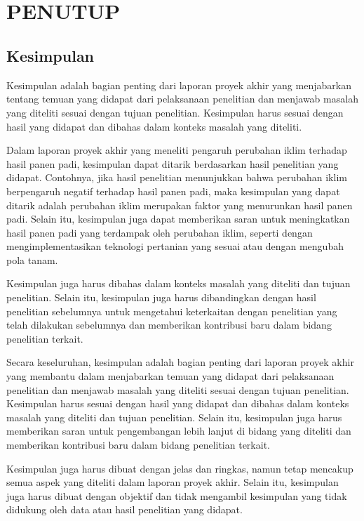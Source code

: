 \chapter[PENUTUP]{\\ PENUTUP}

\section{Kesimpulan}
Kesimpulan adalah bagian penting dari laporan proyek akhir yang menjabarkan tentang temuan yang didapat dari pelaksanaan penelitian dan menjawab masalah yang diteliti sesuai dengan tujuan penelitian. Kesimpulan harus sesuai dengan hasil yang didapat dan dibahas dalam konteks masalah yang diteliti.

Dalam laporan proyek akhir yang meneliti pengaruh perubahan iklim terhadap hasil panen padi, kesimpulan dapat ditarik berdasarkan hasil penelitian yang didapat. Contohnya, jika hasil penelitian menunjukkan bahwa perubahan iklim berpengaruh negatif terhadap hasil panen padi, maka kesimpulan yang dapat ditarik adalah perubahan iklim merupakan faktor yang menurunkan hasil panen padi. Selain itu, kesimpulan juga dapat memberikan saran untuk meningkatkan hasil panen padi yang terdampak oleh perubahan iklim, seperti dengan mengimplementasikan teknologi pertanian yang sesuai atau dengan mengubah pola tanam.

Kesimpulan juga harus dibahas dalam konteks masalah yang diteliti dan tujuan penelitian. Selain itu, kesimpulan juga harus dibandingkan dengan hasil penelitian sebelumnya untuk mengetahui keterkaitan dengan penelitian yang telah dilakukan sebelumnya dan memberikan kontribusi baru dalam bidang penelitian terkait.

Secara keseluruhan, kesimpulan adalah bagian penting dari laporan proyek akhir yang membantu dalam menjabarkan temuan yang didapat dari pelaksanaan penelitian dan menjawab masalah yang diteliti sesuai dengan tujuan penelitian. Kesimpulan harus sesuai dengan hasil yang didapat dan dibahas dalam konteks masalah yang diteliti dan tujuan penelitian. Selain itu, kesimpulan juga harus memberikan saran untuk pengembangan lebih lanjut di bidang yang diteliti dan memberikan kontribusi baru dalam bidang penelitian terkait.

Kesimpulan juga harus dibuat dengan jelas dan ringkas, namun tetap mencakup semua aspek yang diteliti dalam laporan proyek akhir. Selain itu, kesimpulan juga harus dibuat dengan objektif dan tidak mengambil kesimpulan yang tidak didukung oleh data atau hasil penelitian yang didapat.

